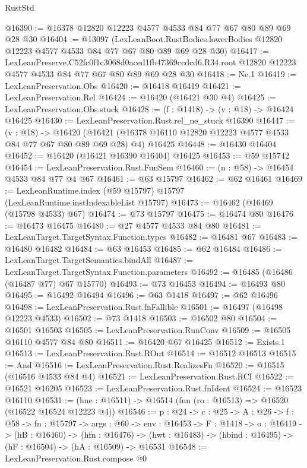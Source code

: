 \begin{lexlean}{RustStd}
\begin{coremodule}
@16390 := @16378 @12820 @12223 @4577 @4533 @84 @77 @67 @80 @89 @69 @28 @30
@16404 := @13097
    (LexLeanBoot.RustBodies.lowerBodies @12820 @12223 @4577 @4533 @84 @77 @67 @80 @89 @69 @28 @30)
@16417 := LexLeanPreserve.C52fc0f1c3068d0aced1fb47369ccdcd6.R34.root
    @12820
    @12223
    @4577
    @4533
    @84
    @77
    @67
    @80
    @89
    @69
    @28
    @30
@16418 := Ne.{1}
@16419 := LexLeanPreservation.Obs
@16420 := @16418 @16419
@16421 := LexLeanPreservation.Rel
@16424 := @16420 (@16421 @30 @4)
@16425 := LexLeanPreservation.Obs.stuck
@16428 := (f : @1418) -> (v : @18) -> @16424 @16425
@16430 := LexLeanPreservation.Rust.rel_ne_stuck @16390
@16447 := (v : @18) ->
  @16420 (@16421 (@16378 @16110 @12820 @12223 @4577 @4533 @84 @77 @67 @80 @89 @69 @28) @4) @16425
@16448 := @16430 @16404
@16452 := @16420 (@16421 @16390 @16404) @16425
@16453 := @59 @15742
@16454 := LexLeanPreservation.Rust.FunSem
@16460 := (n : @58) -> @16454 @4533 @84 @77 @4 @67
@16461 := @63 @15797
@16462 := @62 @16461
@16469 := LexLeanRuntime.index (@59 @15797) @15797 (LexLeanRuntime.instIndexableList @15797)
@16473 := @16462 (@16469 (@15798 @4533) @67)
@16474 := @73 @15797
@16475 := @16474 @80
@16476 := @16473 @16475
@16480 := @27 @4577 @4533 @84 @80
@16481 := LexLeanTarget.TargetSyntax.Function.types
@16482 := @16481 @67
@16483 := @16480 @16482
@16484 := @63 @16453
@16485 := @62 @16484
@16486 := LexLeanTarget.TargetSemantics.bindAll
@16487 := LexLeanTarget.TargetSyntax.Function.parameters
@16492 := @16485 (@16486 (@16487 @77) @67 @15770)
@16493 := @73 @16453
@16494 := @16493 @80
@16495 := @16492 @16494
@16496 := @63 @1418
@16497 := @62 @16496
@16498 := LexLeanPreservation.Rust.fnFallible
@16501 := @16497 (@16498 @12223 @4533)
@16502 := @73 @1418
@16503 := @16502 @80
@16504 := @16501 @16503
@16505 := LexLeanPreservation.RunConv
@16509 := @16505 @16110 @4577 @84 @80
@16511 := @16420 @67 @16425
@16512 := Exists.{1}
@16513 := LexLeanPreservation.Rust.ROut
@16514 := @16512 @16513
@16515 := And
@16516 := LexLeanPreservation.Rust.RealizesFn
@16520 := @16515 (@16516 @4533 @84 @4)
@16521 := LexLeanPreservation.Rust.RCI
@16522 := @16521 @16205
@16523 := LexLeanPreservation.Rust.fnIdent
@16524 := @16523 @16110
@16531 := (hne : @16511) -> @16514 (fun (ro : @16513) => @16520 (@16522 @16524 @12223 @4))
@16546 := {p : @24} ->
  {c : @25} ->
  {A : @26} ->
  {f : @58} ->
  {fn : @15797} ->
  {args : @60} ->
  {env : @16453} ->
  {F : @1418} ->
  {o : @16419} ->
  (hB : @16460) ->
  (hfn : @16476) -> (hwt : @16483) -> (hbind : @16495) -> (hF : @16504) -> (hA : @16509) -> @16531
@16548 := LexLeanPreservation.Rust.compose @0

\end{coremodule}
\end{lexlean}

